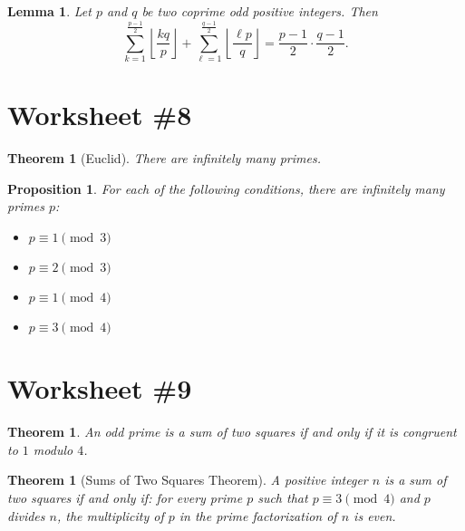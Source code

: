 \documentclass[12pt]{amsart}
\numberwithin{equation}{section}
\theoremstyle{plain} %
\newtheorem{thm}	[section]	{Theorem}
\newtheorem{lem}	[section]	{Lemma}
\newtheorem{prop}	[section]	{Proposition}
\begin{document}
\begin{lem} Let $p$ and $q$ be two coprime odd positive integers. Then 
\[ \sum_{k=1}^{\frac{p-1}{2}} \left \lfloor \frac{kq}{p} \right\rfloor + \sum_{\ell=1}^{\frac{q-1}{2}} \left \lfloor \frac{\ell p}{q} \right\rfloor = \frac{p-1}{2} \cdot \frac{q-1}{2}.\]
\end{lem}

\section*{Worksheet \#8}

\begin{thm}[Euclid] There are infinitely many primes.
\end{thm}

\begin{prop} For each of the following conditions, there are infinitely many primes $p$:
\begin{itemize}
\item $p\equiv 1 \pmod{3}$
\item $p\equiv 2 \pmod{3}$
\item $p\equiv 1 \pmod{4}$
\item $p \equiv 3 \pmod{4}$
\end{itemize}
\end{prop}

\section*{Worksheet \#9}

\begin{thm} An odd prime is a sum of two squares if and only if it is congruent to $1$ modulo $4$. 
\end{thm}


\begin{thm}[Sums of Two Squares Theorem] A positive integer $n$ is a sum of two squares if and only if:
for every prime $p$ such that $p\equiv 3 \pmod{4}$ and $p$ divides $n$, the multiplicity of $p$ in the prime factorization of $n$ is even.
\end{thm}
\end{document}
